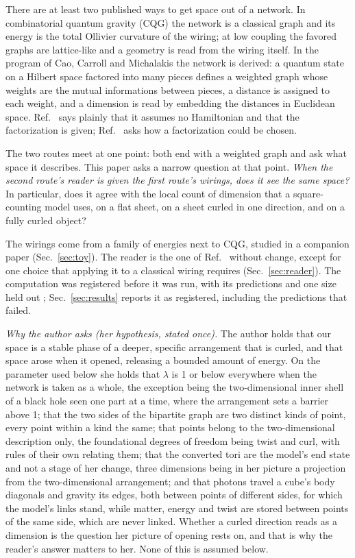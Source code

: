 \documentclass[aps,pre,10pt,twocolumn,superscriptaddress,nofootinbib]{revtex4-2}
\begin{document}
There are at least two published ways to get space out of a network. In combinatorial quantum gravity (CQG)
\cite{T17,KTB19,T25} the network is a classical graph and its energy is the total Ollivier curvature of the wiring;
at low coupling the favored graphs are lattice-like and a geometry is read from the wiring itself. In the program
of Cao, Carroll and Michalakis \cite{CCM16,CC17} the network is derived: a quantum state on a Hilbert space factored
into many pieces defines a weighted graph whose weights are the mutual informations between pieces, a distance is
assigned to each weight, and a dimension is read by embedding the distances in Euclidean space. Ref.~\cite{CCM16}
says plainly that it assumes no Hamiltonian and that the factorization is given; Ref.~\cite{CS20} asks how a
factorization could be chosen.

The two routes meet at one point: both end with a weighted graph and ask what space it describes. This paper asks a
narrow question at that point. \emph{When the second route's reader is given the first route's wirings, does it see
the same space?} In particular, does it agree with the local count of dimension that a square-counting model uses,
on a flat sheet, on a sheet curled in one direction, and on a fully curled object?

The wirings come from a family of energies next to CQG, studied in a companion paper \cite{paper1} (Sec.~\ref{sec:toy}).
The reader is the one of Ref.~\cite{CCM16} without change, except for one choice that applying it to a classical
wiring requires (Sec.~\ref{sec:reader}). The computation was registered before it was run, with its predictions
and one size held out \cite{prereg}; Sec.~\ref{sec:results} reports it as registered, including the predictions that
failed.

\emph{Why the author asks (her hypothesis, stated once).} The author holds that our space is a stable phase of a
deeper, specific arrangement that is curled, and that space arose when it opened, releasing a bounded amount of
energy. On the parameter used below she holds that $\lambda$ is 1 or below everywhere when the network is taken as a
whole, the exception being the two-dimensional inner shell of a black hole seen one part at a time, where the
arrangement sets a barrier above 1; that the two sides of the bipartite graph are two distinct kinds of point, every
point within a kind the same; that points belong to the two-dimensional description only, the foundational degrees of
freedom being twist and curl, with rules of their own relating them; that the converted tori are the model's end state and
not a stage of her change, three dimensions being in her picture a projection from the two-dimensional arrangement; and
that photons travel a cube's body diagonals and gravity its edges, both between points of different sides, for which the
model's links stand, while matter, energy and twist are stored between points of the same side, which are never linked. Whether a curled direction reads as a
dimension is the question her picture of opening rests on, and that is why the reader's answer matters to her. None
of this is assumed below.
\end{document}
